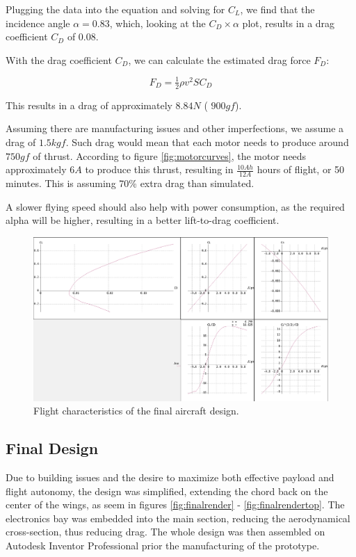 Plugging the data into the equation and solving for $C_L$, we find that the incidence angle $\alpha = 0.83$, which, looking at the $C_D \times \alpha$ plot, results in a drag coefficient $C_D$ of 0.08.

With the drag coefficient $C_D$, we can calculate the estimated drag force $F_D$:

\begin{equation}
F_{D}=\tfrac{1}{2}\rho v^{2} S C_{D}
\end{equation}

This results in a drag of approximately $8.84N$ ( $900 gf$).

Assuming there are manufacturing issues and other imperfections, we assume a drag of $1.5 kgf$. Such drag would mean that each motor needs to produce around $ 750 gf$ of thrust. According to figure \ref{fig:motorcurves}, the motor needs 
approximately $6 A$ to produce this thrust, resulting in $\frac{10Ah}{12A}$ hours of flight, or 50 minutes. This is assuming 70\% extra drag than simulated.

A slower flying speed should also help with power consumption, as the required alpha will be higher, resulting in a better lift-to-drag coefficient.



\begin{figure}
\centering
  \includegraphics[width=\linewidth]{figs/craftpolar2.png}
  \caption{Flight characteristics of the final aircraft design.}
  \label{fig:craftpolar}
\end{figure}


\subsection{Final Design}

Due to building issues and the desire to maximize both effective payload and flight autonomy, the design was simplified, extending the chord back on the center of the wings, as seem in figures \ref{fig:finalrender} - \ref{fig:finalrendertop}.
The electronics bay was embedded into the main section, reducing the aerodynamical cross-section, thus reducing drag. The whole design was then assembled on Autodesk Inventor Professional prior the manufacturing of the prototype.

